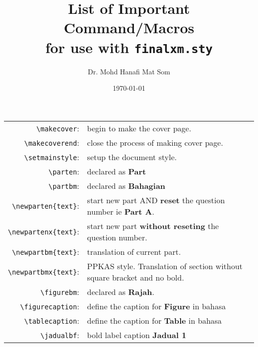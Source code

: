 \documentclass[11pt]{article}
\author{Dr. Mohd Hanafi Mat Som}
\title{\bfseries List of Important Command/Macros \\for use with \texttt{finalxm.sty}}
\date{\today}
\begin{document}
\maketitle	

\begin{table}[H]
	\begin{tabularx}{\linewidth}{r X}
		\verb|\makecover|: & begin to make the cover page. \\
		
		\verb|\makecoverend|: & close the process of making cover page. \\
		
		\verb|\setmainstyle|: & setup the document style. \\
		
		\verb|\parten|: & declared as \textbf{Part} \\
		
		\verb|\partbm|: & declared as \textbf{Bahagian} \\
		
		\verb|\newparten{text}|: & start new part AND \textbf{reset} the question number ie \textbf{Part A}. \\
		
		\verb|\newpartenx{text}|: & start new part \textbf{without reseting} the question number. \\
		
		\verb|\newpartbm{text}|: & translation of current part. \\
		
		\verb|\newpartbmx{text}|: & PPKAS style. Translation of section without square bracket and no bold. \\
		
		\verb|\figurebm|: & declared as \textbf{Rajah}. \\
		
		\verb|\figurecaption|: & define the caption for \textbf{Figure} in bahasa \\
		
		\verb|\tablecaption|: & define the caption for \textbf{Table} in bahasa \\
		
		\verb|\jadualbf|: & bold label caption \textbf{Jadual 1} \\ 
	\end{tabularx}
\end{table}
\end{document}
